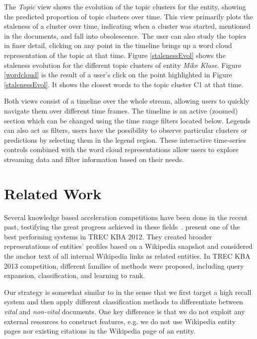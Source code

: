 \documentclass{article}
\begin{document}
The \emph{Topic} view shows the evolution of the topic clusters for the entity, showing the predicted proportion of topic clusters over time.
This view primarily plots the staleness of a cluster over time, indicating when a cluster was started, mentioned in the documents, and fall into obsolescence. 
The user can also study the topics in finer detail, clicking on any point in the timeline brings up a word cloud representation of the topic at that time.
Figure \ref{stalenessEvol} shows the staleness evolution for the different topic clusters of entity \emph{Mike Kluse}. 
Figure \ref{wordcloud} is the result of a user's click on the point highlighted in Figure \ref{stalenessEvol}. 
It shows the closest words to the topic cluster C1 at that time.

Both views consist of a timeline over the whole stream, allowing users to quickly navigate them over different time frames.
The timeline is an active (zoomed) section which can be changed using the time range filters located below. Legends can also act as filters, users have the possibility to observe particular clusters or predictions by selecting them in the legend region.
These interactive time-series controls combined with the word cloud representations allow users to explore streaming data and filter information based on their needs.

\section{Related Work}
\label{related}

Several knowledge based acceleration competitions have been done in the recent past, testifying the great progress achieved in these fields~\cite{gross_doucet_toivonen_trec12}. 
\citet{xitong12} present one of the best performing systems in TREC KBA 2012. 
They created broader representations of entities' profiles based on a Wikipedia snapshot and considered the anchor text of all internal Wikipedia links as related entities. In TREC KBA 2013 competition, different families of methods were proposed, including query expansion, classification, and learning to rank. 

Our strategy is somewhat similar to \citet{jingang13} in the sense that we first target a high recall system and then apply different classification methods to differentiate between \emph{vital} and \emph{non-vital} documents. 
One key difference is that we do not exploit any external resources to construct features, e.g. we do not use Wikipedia entity pages nor existing citations in the Wikipedia page of an entity. 
\end{document}
